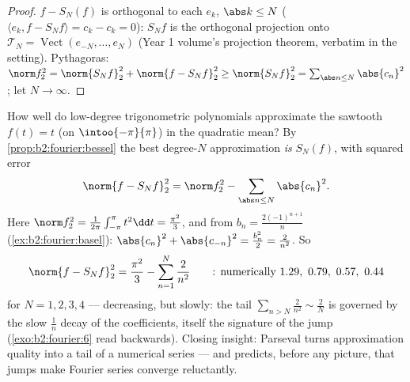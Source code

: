 \begin{proof}
$f - S_N(f)$ is orthogonal to each $e_k$, $\abs k \leq N$ ($\langle
e_k, f - S_N f\rangle = c_k - c_k = 0$): $S_Nf$ is the orthogonal
projection onto $\mathcal{T}_N = \operatorname{Vect}(e_{-N}, \dots,
e_N)$ (Year 1 volume's projection theorem, verbatim in the
 setting). Pythagoras: $\norm f_2^2 = \norm{S_Nf}_2^2 +
\norm{f - S_Nf}_2^2 \geq \norm{S_Nf}_2^2 = \sum_{\abs n \leq N}
\abs{c_n}^2$; let $N \to \infty$.
\end{proof}

\begin{example}\label{ex:b2:fourier:bestapprox}
How well do low-degree trigonometric polynomials approximate
the sawtooth $f(t) = t$ (on $\intoo{-\pi}{\pi}$) in the
quadratic mean? By \cref{prop:b2:fourier:bessel} the best
degree-$N$ approximation \emph{is} $S_N(f)$, with squared error
\[
\norm{f - S_Nf}_2^2 = \norm f_2^2 -
\sum_{\abs n\leq N}\abs{c_n}^2 .
\]
Here $\norm f_2^2 = \frac{1}{2\pi}\int_{-\pi}^\pi t^2\dd t =
\frac{\pi^2}{3}$, and from $b_n = \frac{2(-1)^{n+1}}{n}$
(\cref{ex:b2:fourier:basel}): $\abs{c_n}^2 + \abs{c_{-n}}^2 =
\frac{b_n^2}{2} = \frac{2}{n^2}$. So
\[
\norm{f - S_Nf}_2^2
= \frac{\pi^2}{3} - \sum_{n=1}^{N}\frac{2}{n^2}
\qquad\text{: numerically } 1.29,\ 0.79,\ 0.57,\ 0.44
\]
for $N = 1, 2, 3, 4$ --- decreasing, but slowly: the tail
$\sum_{n>N}\frac2{n^2} \sim \frac2N$ is governed by the slow
$\frac1n$ decay of the coefficients, itself the signature of
the jump (\cref{exo:b2:fourier:6} read backwards). Closing
insight: Parseval turns approximation quality into a tail of a
numerical series --- and predicts, before any picture, that
jumps make Fourier series converge reluctantly.
\end{example}

